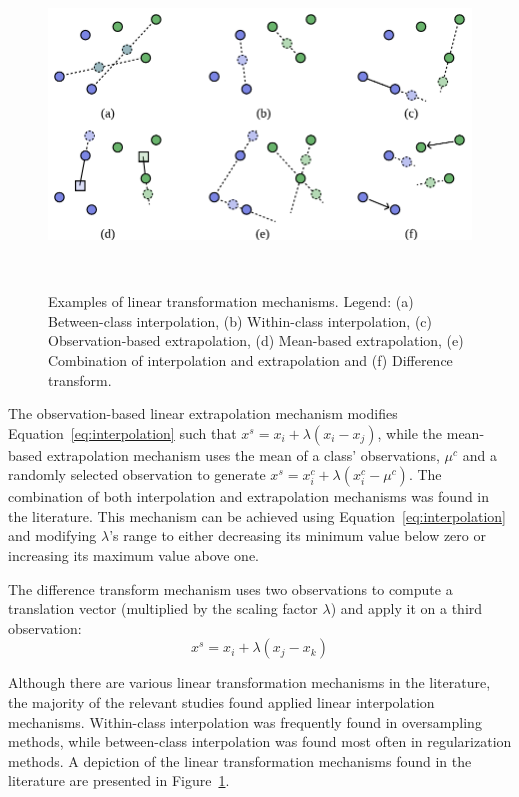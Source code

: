 \documentclass[parskip=full]{scrartcl}
\begin{document}
\begin{figure}
	\centering
	\includegraphics[width=.7\linewidth]{../analysis/linear-transformations}
    \caption{%
        Examples of linear transformation mechanisms. Legend: (a)
        Between-class interpolation, (b) Within-class interpolation, (c)
        Observation-based extrapolation, (d) Mean-based extrapolation, (e)
        Combination of interpolation and extrapolation and (f) Difference
        transform.
    }~\label{fig:linear-transformations}
\end{figure}

The observation-based linear extrapolation mechanism modifies
Equation~\ref{eq:interpolation} such that $x^s = x_i + \lambda(x_i - x_j)$,
while the mean-based extrapolation mechanism uses the mean of a class'
observations, $\mu^c$ and a randomly selected observation to generate $x^s =
x_i^c + \lambda(x_i^c - \mu^c)$. The combination of both interpolation and
extrapolation mechanisms was found in the literature. This mechanism can be
achieved using Equation~\ref{eq:interpolation} and modifying $\lambda$'s range
to either decreasing its minimum value below zero or increasing its maximum
value above one.

The difference transform mechanism uses two observations to compute a
translation vector (multiplied by the scaling factor $\lambda$) and apply it on
a third observation:
\begin{equation}
    x^s = x_i + \lambda(x_j - x_k)
\end{equation}

Although there are various linear transformation mechanisms in the literature,
the majority of the relevant studies found applied linear interpolation
mechanisms. Within-class interpolation was frequently found in oversampling
methods, while between-class interpolation was found most often in
regularization methods. A depiction of the linear transformation mechanisms
found in the literature are presented in
Figure~\ref{fig:linear-transformations}.
\end{document}
